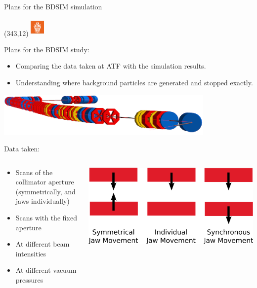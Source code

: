 \documentclass[xcolor={dvipsnames}]{beamer}
\newcommand{\rhullogo}{
  \setlength{\TPHorizModule}{1pt}
  \setlength{\TPVertModule}{1pt}
  \begin{textblock}{1}(343,12)
   \includegraphics[width=20pt,height=26pt]{figures/rhul_logo.png}
  \end{textblock}
}
\begin{document}
\begin{frame}{Plans for the BDSIM simulation}
\rhullogo
Plans for the BDSIM study:
\begin{itemize}
 \item Comparing the data taken at ATF with the simulation results.
 \item Understanding where background particles are generated and stopped exactly.
\end{itemize}

\begin{center}
  \includegraphics[width=0.8\textwidth]{figures/atf_bdsim.png}\\
\end{center}

Data taken:
\begin{columns}
 \begin{column}[c]{0.6\textwidth}
\begin{itemize}
 \item Scans of the collimator aperture (symmetrically, and jaws individually)
 \item Scans with the fixed aperture
 \item At different beam intensities
 \item At different vacuum pressures
\end{itemize}
 \end{column}
  \begin{column}[c]{0.4\textwidth}
 \centering
\includegraphics[width=\textwidth]{figures/Jaw_movements.png}\\
 \end{column}
 \end{columns}

\end{frame}
\end{document}
